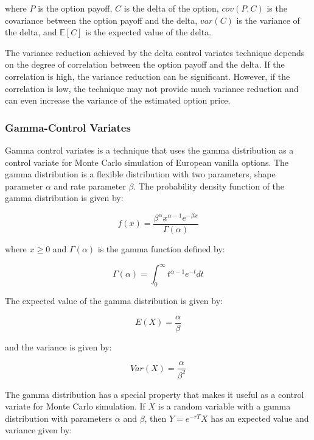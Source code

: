 \documentclass[11pt, a4paper, leqno]{article}
\begin{document}
where $P$ is the option payoff, $C$ is the delta of the option, $cov(P,C)$ is the covariance between the option payoff and the delta, $var(C)$ is the variance of the delta, and $\mathbb{E}[C]$ is the expected value of the delta.

The variance reduction achieved by the delta control variates technique depends on the degree of correlation between the option payoff and the delta. If the correlation is high, the variance reduction can be significant. However, if the correlation is low, the technique may not provide much variance reduction and can even increase the variance of the estimated option price.

\subsubsection{Gamma-Control Variates}

Gamma control variates is a technique that uses the gamma distribution as a control variate for Monte Carlo simulation of European vanilla options. The gamma distribution is a flexible distribution with two parameters, shape parameter $\alpha$ and rate parameter $\beta$. The probability density function of the gamma distribution is given by:

\begin{equation}
f(x) = \frac{\beta^{\alpha}x^{\alpha - 1}e^{-\beta x}}{\Gamma(\alpha)}
\end{equation}

where $x \geq 0$ and $\Gamma(\alpha)$ is the gamma function defined by:

\begin{equation}
\Gamma(\alpha) = \int_{0}^{\infty} t^{\alpha - 1} e^{-t} dt
\end{equation}

The expected value of the gamma distribution is given by:

\begin{equation}
E(X) = \frac{\alpha}{\beta}
\end{equation}

and the variance is given by:

\begin{equation}
Var(X) = \frac{\alpha}{\beta^2}
\end{equation}

The gamma distribution has a special property that makes it useful as a control variate for Monte Carlo simulation. If $X$ is a random variable with a gamma distribution with parameters $\alpha$ and $\beta$, then $Y = e^{-rT}X$ has an expected value and variance given by:
\end{document}
